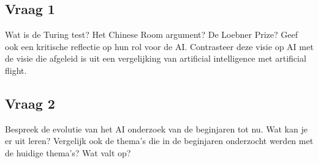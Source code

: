 \documentclass[../main.tex]{subfiles}
\begin{document}
\subsection{Vraag 1}
\begin{question}
	Wat is de Turing test? Het Chinese Room argument? De Loebner Prize? Geef ook een kritische reflectie op 
	hun rol voor de AI. Contrasteer deze visie op AI met de visie die afgeleid is uit een vergelijking van 
	artificial intelligence met artificial flight.
\end{question}

\begin{solution}
	
\end{solution}

\subsection{Vraag 2}
\begin{question}
	Bespreek de evolutie van het AI onderzoek van de beginjaren tot nu. Wat kan je er uit leren? Vergelijk ook 
	de thema's die in de beginjaren onderzocht werden met de huidige thema's? Wat valt op?
\end{question}

\begin{solution}
	
\end{solution}
\end{document}
